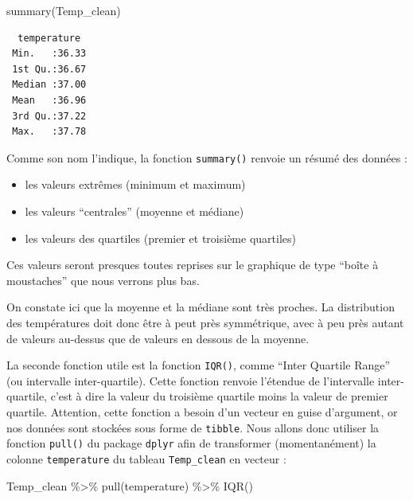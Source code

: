 \documentclass[
  a4paper,
]{article}
\newenvironment{Shaded}{\begin{snugshade}}{\end{snugshade}}
\newcommand{\FunctionTok}[1]{\textcolor[rgb]{0.39,0.29,0.61}{#1}}
\newcommand{\NormalTok}[1]{\textcolor[rgb]{0.12,0.11,0.11}{#1}}
\newcommand{\SpecialCharTok}[1]{\textcolor[rgb]{0.24,0.68,0.91}{#1}}
\providecommand{\tightlist}{%
  \setlength{\itemsep}{0pt}\setlength{\parskip}{0pt}}
\begin{document}
\begin{Shaded}
\begin{Highlighting}[]
\FunctionTok{summary}\NormalTok{(Temp\_clean)}
\end{Highlighting}
\end{Shaded}

\begin{verbatim}
  temperature   
 Min.   :36.33  
 1st Qu.:36.67  
 Median :37.00  
 Mean   :36.96  
 3rd Qu.:37.22  
 Max.   :37.78  
\end{verbatim}

Comme son nom l'indique, la fonction \texttt{summary()} renvoie un résumé des données :

\begin{itemize}
\tightlist
\item
  les valeurs extrêmes (minimum et maximum)
\item
  les valeurs ``centrales'' (moyenne et médiane)
\item
  les valeurs des quartiles (premier et troisième quartiles)
\end{itemize}

Ces valeurs seront presques toutes reprises sur le graphique de type ``boîte à moustaches'' que nous verrons plus bas.

On constate ici que la moyenne et la médiane sont très proches. La distribution des températures doit donc être à peut près symmétrique, avec à peu près autant de valeurs au-dessus que de valeurs en dessous de la moyenne.

La seconde fonction utile est la fonction \texttt{IQR()}, comme ``Inter Quartile Range'' (ou intervalle inter-quartile). Cette fonction renvoie l'étendue de l'intervalle inter-quartile, c'est à dire la valeur du troisième quartile moins la valeur de premier quartile. Attention, cette fonction a besoin d'un vecteur en guise d'argument, or nos données sont stockées sous forme de \texttt{tibble}. Nous allons donc utiliser la fonction \texttt{pull()} du package \texttt{dplyr} afin de transformer (momentanément) la colonne \texttt{temperature} du tableau \texttt{Temp\_clean} en vecteur :

\begin{Shaded}
\begin{Highlighting}[]
\NormalTok{Temp\_clean }\SpecialCharTok{\%\textgreater{}\%} 
  \FunctionTok{pull}\NormalTok{(temperature) }\SpecialCharTok{\%\textgreater{}\%} 
  \FunctionTok{IQR}\NormalTok{()}
\end{Highlighting}
\end{Shaded}
\end{document}
